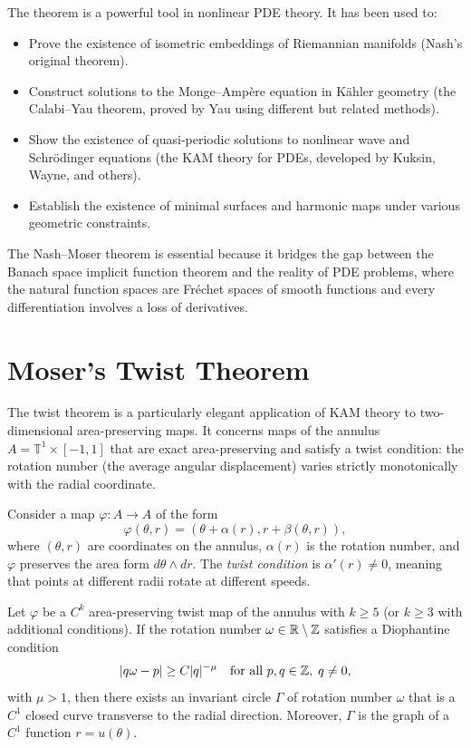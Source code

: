 The theorem is a powerful tool in nonlinear PDE theory. It has been used to:
\begin{itemize}
\item Prove the existence of isometric embeddings of Riemannian manifolds (Nash's original theorem).
\item Construct solutions to the Monge--Amp\`ere equation in K\"ahler geometry (the Calabi--Yau theorem, proved by Yau using different but related methods).
\item Show the existence of quasi-periodic solutions to nonlinear wave and Schr\"odinger equations (the KAM theory for PDEs, developed by Kuksin, Wayne, and others).
\item Establish the existence of minimal surfaces and harmonic maps under various geometric constraints.
\end{itemize}

The Nash--Moser theorem is essential because it bridges the gap between the Banach space implicit function theorem and the reality of PDE problems, where the natural function spaces are Fr\'echet spaces of smooth functions and every differentiation involves a loss of derivatives.

\section{Moser's Twist Theorem}

The twist theorem is a particularly elegant application of KAM theory to two-dimensional area-preserving maps. It concerns maps of the annulus $A = \mathbb{T}^1 \times [-1, 1]$ that are exact area-preserving and satisfy a twist condition: the rotation number (the average angular displacement) varies strictly monotonically with the radial coordinate.

Consider a map $\varphi: A \to A$ of the form
\[
\varphi(\theta, r) = (\theta + \alpha(r), r + \beta(\theta, r)),
\]
where $(\theta, r)$ are coordinates on the annulus, $\alpha(r)$ is the rotation number, and $\varphi$ preserves the area form $d\theta \wedge dr$. The \textit{twist condition} is $\alpha'(r) \neq 0$, meaning that points at different radii rotate at different speeds.

\begin{theorem}
Let $\varphi$ be a $C^k$ area-preserving twist map of the annulus with $k \geq 5$ (or $k \geq 3$ with additional conditions). If the rotation number $\omega \in \mathbb{R} \setminus \mathbb{Z}$ satisfies a Diophantine condition
\[
|q\omega - p| \geq C|q|^{-\mu} \quad \text{for all } p, q \in \mathbb{Z},\; q \neq 0,
\]
with $\mu > 1$, then there exists an invariant circle $\Gamma$ of rotation number $\omega$ that is a $C^1$ closed curve transverse to the radial direction. Moreover, $\Gamma$ is the graph of a $C^1$ function $r = u(\theta)$.
\end{theorem}

